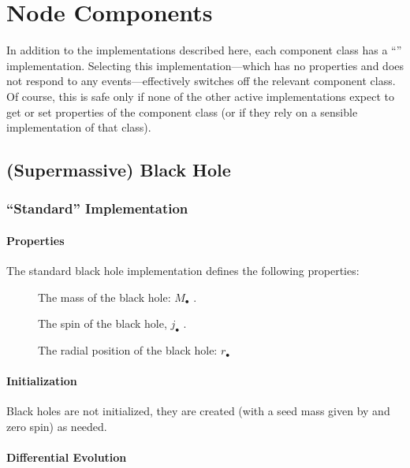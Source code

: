 \chapter{Node Components}\label{sec:Components}

In addition to the implementations described here, each component class has a ``'' implementation. Selecting this implementation---which has no properties and does not respond to any events---effectively switches off the relevant component class. Of course, this is safe only if none of the other active implementations expect to get or set properties of the component class (or if they rely on a sensible implementation of that class).

\section{(Supermassive) Black Hole}

\subsection{``Standard'' Implementation}

\subsubsection{Properties}

The standard black hole implementation defines the following properties:
\begin{description}
 \item [] The mass of the black hole: $M_\bullet$ \mono{[blackHoleMass]}.
 \item [] The spin of the black hole, $j_\bullet$ \mono{[blackHoleSpin]}.
 \item [] The radial position of the black hole: $r_\bullet$ \mono{[blackHoleRadialPosition]} 
\end{description}

\subsubsection{Initialization}

Black holes are not initialized, they are created (with a seed mass given by  and zero spin) as needed.

\subsubsection{Differential Evolution}

